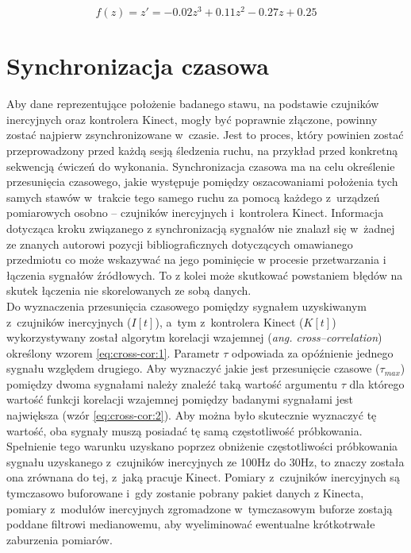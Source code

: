 \begin{equation}
	f(z) = z' = -0.02z^3 + 0.11z^2 - 0.27z + 0.25
	\label{eq:distCorr}
\end{equation}
										 
										
\section{Synchronizacja czasowa}
										
Aby dane reprezentujące położenie badanego stawu, na podstawie czujników inercyjnych oraz kontrolera Kinect, mogły być poprawnie złączone, powinny zostać najpierw zsynchronizowane w~czasie. Jest to proces, który powinien zostać przeprowadzony przed każdą sesją śledzenia ruchu, na przykład przed konkretną sekwencją ćwiczeń do wykonania. Synchronizacja czasowa ma na celu określenie przesunięcia czasowego, jakie występuje pomiędzy oszacowaniami położenia tych samych stawów w~trakcie tego samego ruchu za pomocą każdego z~urządzeń pomiarowych osobno -- czujników inercyjnych i~kontrolera Kinect. Informacja dotycząca kroku związanego z synchronizacją sygnałów nie znalazł się w~żadnej ze znanych autorowi pozycji bibliograficznych dotyczących omawianego przedmiotu co może wskazywać na jego pominięcie w procesie przetwarzania i łączenia sygnałów źródłowych. To z kolei może skutkować powstaniem błędów na skutek łączenia nie skorelowanych ze sobą danych.\\
Do wyznaczenia przesunięcia czasowego pomiędzy sygnałem uzyskiwanym z~czujników inercyjnych ($I[t]$), a~tym z~kontrolera Kinect ($K[t]$) wykorzystywany został algorytm korelacji wzajemnej (\emph{ang. cross--correlation}) określony wzorem \ref{eq:cross-cor:1}. Parametr $\tau$ odpowiada za opóźnienie jednego sygnału względem drugiego. Aby wyznaczyć jakie jest przesunięcie czasowe ($\tau_{max}$) pomiędzy dwoma sygnałami należy znaleźć taką wartość argumentu $\tau$ dla którego wartość funkcji korelacji wzajemnej pomiędzy badanymi sygnałami jest największa (wzór \ref{eq:cross-cor:2}). Aby można było skutecznie wyznaczyć tę wartość, oba sygnały muszą posiadać tę samą częstotliwość próbkowania. Spełnienie tego warunku uzyskano poprzez obniżenie częstotliwości próbkowania sygnału uzyskanego z~czujników inercyjnych ze 100Hz  do 30Hz, to znaczy została ona zrównana do tej, z~jaką pracuje Kinect. Pomiary z~czujników inercyjnych są tymczasowo buforowane i~gdy zostanie pobrany pakiet danych z Kinecta, pomiary z~modułów inercyjnych zgromadzone w~tymczasowym buforze zostają poddane filtrowi medianowemu, aby wyeliminować ewentualne krótkotrwałe zaburzenia pomiarów. 
										

